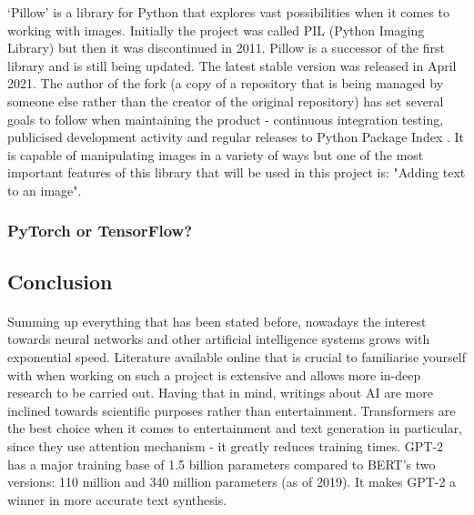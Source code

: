 \documentclass[12pt]{report}
\begin{document}
    `Pillow' is a library for Python that explores vast possibilities when it comes to working with images. Initially the project was called PIL (Python Imaging Library) but then it was discontinued in 2011.
    Pillow is a successor of the first library and is still being updated. The latest stable version was released in April 2021. The author of the fork (a copy of a repository that is being managed by someone else rather than the creator of the original repository) has set several goals to follow when maintaining the product - continuous integration testing, publicised development activity and regular releases to Python Package Index \citep{pillow_about}. 
    It is capable of manipulating images in a variety of ways but one of the most important features of this library that will be used in this project is: "Adding text to an image".

    \subsubsection*{PyTorch or TensorFlow?}
    \paragraph{}

    \subsection*{Conclusion}
    \paragraph{}

    Summing up everything that has been stated before, nowadays the interest towards neural networks and other artificial intelligence systems grows with exponential speed. Literature available online that is crucial to familiarise yourself with when working on such a project is extensive and allows more in-deep research to be carried out. Having that in mind, writings about AI are more inclined towards scientific purposes rather than entertainment.
    Transformers are the best choice when it comes to entertainment and text generation in particular, since they use attention mechanism - it greatly reduces training times. GPT-2 has a major training base of 1.5 billion parameters compared to BERT's two versions: 110 million and 340 million parameters (as of 2019). It makes GPT-2 a winner in more accurate text synthesis.
\end{document}
